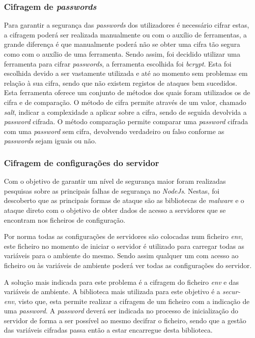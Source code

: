 \subsubsection{Cifragem de \textit{passwords}}
Para garantir a segurança das \textit{\textit{passwords}} dos utilizadores é necessário cifrar estas, a cifragem poderá ser realizada manualmente ou com o auxílio de ferramentas, a grande diferença é que manualmente poderá não se obter uma cifra tão segura como com o auxílio de uma ferramenta. Sendo assim, foi decidido utilizar uma ferramenta para cifrar \textit{\textit{passwords}}, a ferramenta escolhida foi \textit{bcrypt}. Esta foi escolhida devido a ser vastamente utilizada e até ao momento sem problemas em relação à sua cifra, sendo que não existem registos de ataques bem sucedidos. Esta ferramenta oferece um conjunto de métodos dos quais foram utilizados os de cifra e de comparação. O método de cifra permite através de um valor, chamado \textit{salt}, indicar a complexidade a aplicar sobre a cifra, sendo de seguida devolvida a \textit{\textit{password}} cifrada. O método comparação permite comparar uma \textit{\textit{password}} cifrada com uma \textit{\textit{password}} sem cifra, devolvendo verdadeiro ou falso conforme as \textit{\textit{passwords}} sejam iguais ou não.

\newpage

\subsubsection{Cifragem de configurações do servidor}
Com o objetivo de garantir um nível de segurança maior foram realizadas pesquisas sobre as principais falhas de segurança no \textit{NodeJs}. Nestas, foi descoberto que as principais formas de ataque são as bibliotecas de \textit{malware} e o ataque direto com o objetivo de obter dados de acesso a servidores que se encontram nos ficheiros de configuração.

Por norma todas as configurações de servidores são colocadas num ficheiro \textit{env}, este ficheiro no momento de iniciar o servidor é utilizado para carregar todas as variáveis para o ambiente do mesmo. Sendo assim qualquer um com acesso ao ficheiro ou às variáveis de ambiente poderá ver todas as configurações do servidor.

A solução mais indicada para este problema é a cifragem do ficheiro \textit{env} e das variáveis de ambiente. A biblioteca mais utilizada para este objetivo é a \textit{secur-env}, visto que, esta permite realizar a cifragem de um ficheiro com a indicação de uma \textit{\textit{password}}. A \textit{\textit{password}} deverá ser indicada no processo de inicialização do servidor de forma a ser possível ao mesmo decifrar o ficheiro, sendo que a gestão das variáveis cifradas passa então a estar encarregue desta biblioteca.

